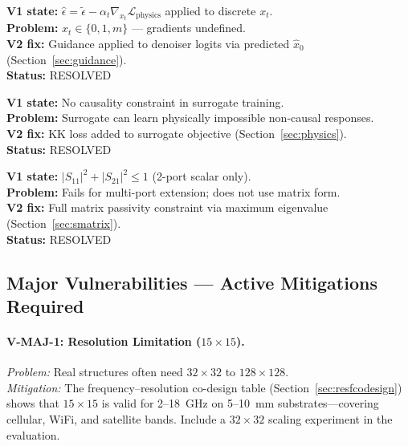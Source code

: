 \documentclass[12pt,a4paper]{article}
\theoremstyle{definition}
\theoremstyle{plain}
\theoremstyle{remark}
\begin{document}
\begin{tcolorbox}[fixbox, title=V-CRIT-2: Gradient Guidance on Discrete Variables]
\textbf{V1 state:}
$\hat{\epsilon} = \tilde{\epsilon} - \alpha_t \nabla_{x_t}\mathcal{L}_{\mathrm{physics}}$
applied to discrete $x_t$.\\
\textbf{Problem:} $x_t \in \{0,1,m\}$ — gradients undefined.\\
\textbf{V2 fix:} Guidance applied to denoiser logits via predicted $\hat{x}_0$
(Section~\ref{sec:guidance}).\\
\textbf{Status:} \textcolor{okgreen}{RESOLVED}
\end{tcolorbox}

\begin{tcolorbox}[fixbox, title=V-CRIT-3: Missing Kramers--Kronig Causality]
\textbf{V1 state:} No causality constraint in surrogate training.\\
\textbf{Problem:} Surrogate can learn physically impossible non-causal responses.\\
\textbf{V2 fix:} KK loss added to surrogate objective (Section~\ref{sec:physics}).\\
\textbf{Status:} \textcolor{okgreen}{RESOLVED}
\end{tcolorbox}

\begin{tcolorbox}[fixbox, title=V-CRIT-4: Incomplete Passivity Constraint]
\textbf{V1 state:} $|S_{11}|^2 + |S_{21}|^2 \leq 1$ (2-port scalar only).\\
\textbf{Problem:} Fails for multi-port extension; does not use matrix form.\\
\textbf{V2 fix:} Full matrix passivity constraint via maximum eigenvalue
(Section~\ref{sec:smatrix}).\\
\textbf{Status:} \textcolor{okgreen}{RESOLVED}
\end{tcolorbox}

\subsection{Major Vulnerabilities — Active Mitigations Required}

\paragraph{V-MAJ-1: Resolution Limitation ($15\times15$).}
\textit{Problem:} Real structures often need $32\times32$ to $128\times128$.\\
\textit{Mitigation:}
The frequency--resolution co-design table (Section~\ref{sec:resfcodesign}) shows that
$15\times15$ is valid for 2--18~GHz on 5--10~mm substrates—covering cellular, WiFi,
and satellite bands.
Include a $32\times32$ scaling experiment in the evaluation.
\end{document}
